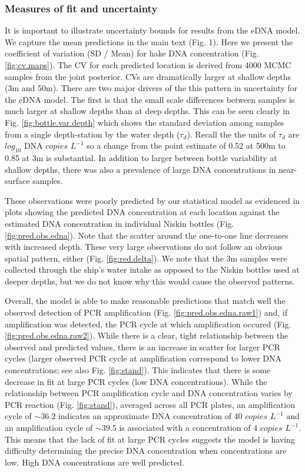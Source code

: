 \documentclass[
]{article}
\begin{document}
\hypertarget{measures-of-fit-and-uncertainty}{%
\subsubsection{Measures of fit and
uncertainty}\label{measures-of-fit-and-uncertainty}}

It is important to illustrate uncertainty bounds for results from the
eDNA model. We capture the mean predictions in the main text (Fig. 1).
Here we present the coefficient of variation (SD / Mean) for hake DNA
concentration (Fig. \ref{fig:cv.maps}). The CV for each predicted
location is derived from 4000 MCMC samples from the joint posterior. CVs
are dramatically larger at shallow depths (3m and 50m). There are two
major drivers of the this pattern in uncertainty for the eDNA model. The
first is that the small scale differences between samples is much larger
at shallow depths than at deep depths. This can be seen clearly in Fig.
\ref{fig:bottle.var.depth} which shows the standard deviation among
samples from a single depth-station by the water depth (\(\tau_d\)).
Recall the the units of \(\tau_d\) are \(log_{10}\) DNA \(copies\)
\(L^{-1}\) so a change from the point estimate of 0.52 at 500m to 0.85
at 3m is substantial. In addition to larger between bottle variability
at shallow depths, there was also a prevalence of large DNA
concentrations in near-surface samples.

These observations were poorly predicted by our statistical model as
evidenced in plots showing the predicted DNA concentration at each
location against the estimated DNA concentration in individual Niskin
bottles (Fig. \ref{fig:pred.obs.edna}). Note that the scatter around the
one-to-one line decreases with increased depth. These very large
observations do not follow an obvious spatial pattern, either (Fig.
\ref{fig:red.delta}). We note that the 3m samples were collected through
the ship's water intake as opposed to the Niskin bottles used at deeper
depths, but we do not know why this would cause the observed patterns.

Overall, the model is able to make reasonable predictions that match
well the observed detection of PCR amplification (Fig.
\ref{fig:pred.obs.edna.raw1}) and, if amplification was detected, the
PCR cycle at which amplification occured (Fig.
\ref{fig:pred.obs.edna.raw2}). While there is a clear, tight
relationship between the observed and predicted values, there is an
increase in scatter for larger PCR cycles (larger observed PCR cycle at
amplification correspond to lower DNA concentrations; see also Fig.
\ref{fig:stand}). This indicates that there is some decrease in fit at
large PCR cycles (low DNA concentrations). While the relationship
between PCR amplification cycle and DNA concentration varies by PCR
reaction (Fig. \ref{fig:stand}), averaged across all PCR plates, an
amplification cycle of \(\sim 36.2\) indicates an approximate DNA
concentration of 40 \(copies\) \(L^{-1}\) and an amplification cycle of
\(\sim 39.5\) is associated with a concentration of 4 \(copies\)
\(L^{-1}\). This means that the lack of fit at large PCR cycles suggests
the model is having difficulty determining the precise DNA concentration
when concentrations are low. High DNA concentrations are well predicted.
\end{document}
